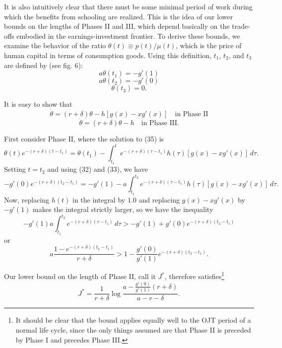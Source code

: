 \documentclass[11pt,fleqn]{article}
\begin{document}
It is also intuitively clear that there must be some minimal period of work during which the benefits from schooling are realized. This is the idea of our lower bounds on the lengths of Phases II and III, which depend basically on the trade-offs embodied in the earnings-investment frontier. To derive these bounds, we examine the behavior of the ratio $\theta(t) \equiv p(t)/\mu(t)$, which is the price of human capital in terms of consumption goods. Using this definition, $t_1$, $t_2$, and $t_3$ are defined by (see fig. 6):
\begin{equation}
a\theta(t_1) = -g'(1)
\end{equation}
\begin{equation}
a\theta(t_2) = -g'(0)
\end{equation}
\begin{equation}
\theta(t_3) = 0.
\end{equation}

It is easy to show that
\begin{equation}
\dot{\theta} = (r + \delta)\theta - h[g(x) - xg'(x)] \quad \text{in Phase II}
\end{equation}
\begin{equation}
\dot{\theta} = (r + \delta)\theta - h \quad \text{in Phase III}.
\end{equation}

First consider Phase II, where the solution to (35) is
\[
\theta(t)e^{-(r+\delta)(t-t_1)} = \theta(t_1) - \int_{t_1}^{t} e^{-(r+\delta)(\tau-t_1)} h(\tau) [g(x) - xg'(x)] \, d\tau.
\]
Setting $t = t_2$ and using (32) and (33), we have
\[
-g'(0)e^{-(r+\delta)(t_2-t_1)} = -g'(1) - a \int_{t_1}^{t_2} e^{-(r+\delta)(\tau-t_1)} h(\tau) [g(x) - xg'(x)] \, d\tau.
\]
Now, replacing $h(t)$ in the integral by $1.0$ and replacing $g(x) - xg'(x)$ by $-g'(1)$ makes the integral strictly larger, so we have the inequality
\[
-g'(1)a \int_{t_1}^{t_2} e^{-(r+\delta)(\tau-t_1)} \, d\tau > -g'(1) + g'(0)e^{-(r+\delta)(t_2-t_1)}
\]
or
\[
a \frac{1 - e^{-(r+\delta)(t_2-t_1)}}{r + \delta} > 1 - \frac{g'(0)}{g'(1)} e^{-(r+\delta)(t_2-t_1)}.
\]

Our lower bound on the length of Phase II, call it $J^*$, therefore satisfies\footnote{It should be clear that the bound applies equally well to the OJT period of a normal life cycle, since the only things assumed are that Phase II is preceded by Phase I and precedes Phase III.}
\begin{equation}
J^* = \frac{1}{r + \delta} \log \frac{a - \frac{g'(0)}{g'(1)}(r + \delta)}{a - r - \delta}.
\end{equation}
\end{document}
